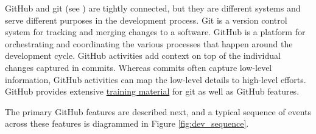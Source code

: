 \documentclass[]{nrel}
\begin{document}
GitHub and git (see ) are tightly connected, but they are different
systems and serve different purposes in the development process.
Git is a version control system for tracking and merging changes to a software.
GitHub is a platform for orchestrating and coordinating the various processes that happen
around the development cycle.
GitHub activities add context on top of the individual changes captured in commits.
Whereas commits often capture low-level information, GitHub activities can map the low-level
details to high-level efforts.
GitHub provides extensive \href{https://docs.github.com/en/get-started/quickstart/git-and-github-learning-resources}{training material}
for git as well as GitHub features.

The primary GitHub features are described next, and a typical sequence of events across these
features is diagrammed in Figure \ref{fig:dev_sequence}.
\end{document}
